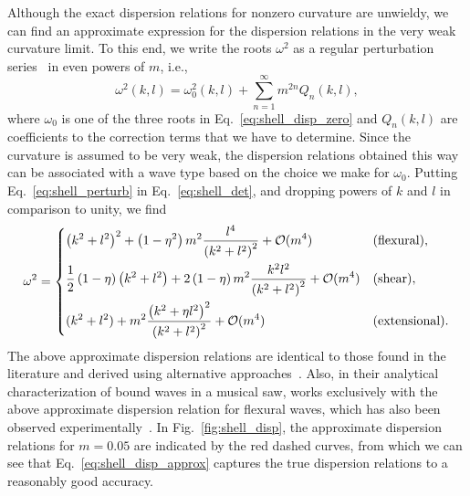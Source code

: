 Although the exact dispersion relations for nonzero curvature are unwieldy, we can find an approximate expression for the dispersion relations in the very weak curvature limit.
To this end, we write the roots $\omega^{2}$ as a regular perturbation series~\cite{bender1978} in even powers of $m$, i.e.,
%
\begin{equation}
  \omega^{2}(k, l) = \omega^{2}_{0}(k, l) + \sum_{n = 1}^{\infty} m^{2n}Q_{n}(k, l),
  \label{eq:shell_perturb}
\end{equation}
%
where $\omega_{0}$ is one of the three roots in Eq.~\eqref{eq:shell_disp_zero} and $Q_{n}(k, l)$ are coefficients to the correction terms that we have to determine.
Since the curvature is assumed to be very weak, the dispersion relations obtained this way can be associated with a wave type based on the choice we make for $\omega_{0}$.
Putting Eq.~\eqref{eq:shell_perturb} in Eq.~\eqref{eq:shell_det}, and dropping powers of $k$ and $l$ in comparison to unity, we find
%
\begin{equation}
  \omega^{2} =
  \begin{dcases}
    \left(k^{2} + l^{2}\right)^{2} + \left(1 - \eta^{2}\right)m^{2}\frac{l^{4}}{\left(k^{2} + l^{2}\right)^{2}} + \mathcal{O}(m^{4}) & \text{(flexural)}, \\
    \frac{1}{2}\left(1-\eta\right)\left(k^{2} + l^{2}\right) + 2\left(1 - \eta\right)m^{2}\frac{k^{2}l^{2}}{\left(k^{2} + l^{2}\right)^{2}} + \mathcal{O}(m^{4}) & \text{(shear)},\\
    (k^{2} + l^{2}) + m^{2}\frac{\left(k^{2} + \eta l^{2}\right)^{2}}{\left(k^{2} + l^{2}\right)^{2}} + \mathcal{O}(m^{4}) & \text{(extensional)}.
  \end{dcases}
  \label{eq:shell_disp_approx}
\end{equation}
%
The above approximate dispersion relations are identical to those found in the literature and derived using alternative approaches~\cite{germogenova1973,pierce1993,norris1994,rebinsky1996}.
Also, in their analytical characterization of bound waves in a musical saw, \citet{shankar2022} works exclusively with the above approximate dispersion relation for flexural waves, which has also been observed experimentally~\cite{williams1990}.
In Fig.~\ref{fig:shell_disp}, the approximate dispersion relations for $m = 0.05$ are indicated by the red dashed curves, from which we can see that Eq.~\eqref{eq:shell_disp_approx} captures the true dispersion relations to a reasonably good accuracy.

